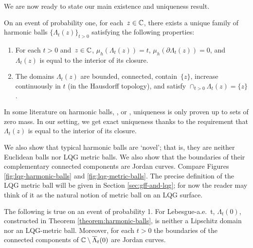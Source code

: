 \documentclass[12pt]{amsart}
\numberwithin{equation}{section}
\begin{document}
	
	
	We are now ready to state our main existence and uniqueness result. 
	
	\begin{theorem} \label{theorem:harmonic-balls}
		On an event of probability one, for each~$z \in \mathbb{C}$, there exists a unique family of harmonic balls $\{\Lambda_t(z)\}_{t > 0}$
		satisfying the following properties:
		\begin{enumerate}[label=(\alph*)]
			\item For each $t > 0$ and~$z\in\mathbb{C}$, $\mu_h(\Lambda_t(z)) = t$, $\mu_h(\partial \Lambda_t(z)) = 0$, and $\Lambda_t(z)$ is equal to the interior of its closure. %
			\item The domains $\Lambda_t(z)$ are bounded, connected, contain~$\{z\}$, increase continuously in $t$ (in the Hausdorff topology), and satisfy $\cap_{t > 0} \Lambda_t(z) = \{z\}$.
		\end{enumerate}
	\end{theorem}
	In some literature on harmonic balls, \eg, \cite{sakai1984solutions} or \cite{hedenmalm2002hele}, uniqueness is only proven up to sets of zero mass. In our setting, we get exact uniqueness thanks to the requirement that $\Lambda_t(z)$ is equal to the interior of its closure.
	
	We also show that typical harmonic balls are `novel'; that is, they are 
	neither Euclidean balls nor LQG metric balls. We also show that the boundaries of their complementary connected components are Jordan curves. Compare Figures \ref{fig:lqg-harmonic-balls} and \ref{fig:lqg-metric-balls}. 
	The precise definition of the LQG metric ball will be given in Section \ref{sec:gff-and-lqg}; for now the reader may think of 
	it as the natural notion of metric ball on an LQG surface. 
	
	
	
	
	\begin{theorem} \label{theorem:harmonic-balls-properties}
		The following is true on an event of probability 1. For Lebesgue-a.e.\ t, $\Lambda_t(0)$, constructed in Theorem \ref{theorem:harmonic-balls}, 
		is neither a Lipschitz domain nor an LQG-metric ball. Moreover, for each $t>0$ the boundaries of the connected components of $\mathbb{C}\setminus \overline{\Lambda}_t(0)$ are Jordan curves. 
	\end{theorem}
	
\end{document}

